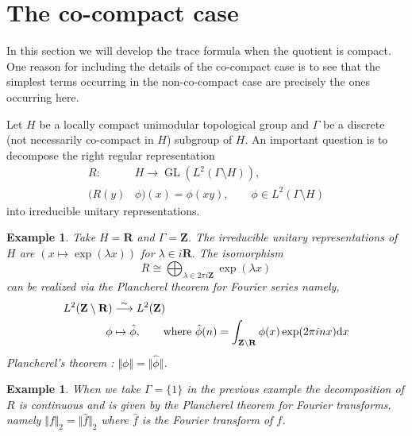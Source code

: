 \documentclass[11pt]{amsart}
\def\R{\mathbf R}
\def\Z{\mathbf Z}
\def\d{\text d}
\def\bs{\setminus}
\def\gl{\operatorname{GL}}
\def\Ltwo{L^2}
\def\norm#1{\Vert #1 \Vert} %
\newtheorem{example}[theorem]{Example}
\theoremstyle{remark}
\begin{document}
\section{The co-compact case} \label{sec_cpt}

In this section we will develop the trace formula when the quotient is compact. One reason for including the details of the co-compact case is to see that the simplest terms occurring in the non-co-compact case are precisely the ones occurring here. 

Let $H$ be a locally compact unimodular topological group and $\Gamma$ be a discrete (not necessarily co-compact in $H$) subgroup of $H$. An important question is to decompose the right regular representation 
\begin{align*}
	R : & H \to \gl(\Ltwo(\Gamma \bs H)), \\
	(R(y) & \phi)(x) = \phi(xy), \qquad \phi \in \Ltwo(\Gamma\bs H)
\end{align*}
into irreducible unitary representations. 
\begin{example}
	Take $H = \R$ and $\Gamma = \Z$. The irreducible unitary representations of $H$ are $(x \mapsto \exp(\lambda x)) $ for $\lambda \in i\R.$ The isomorphism 
	\[ R \cong \displaystyle\bigoplus_{\lambda \in 2\pi i \Z} \exp(\lambda x) \]
	can be realized via the Plancherel theorem for Fourier series namely,
	\begin{align*}
		\Ltwo(\Z \bs \R) & \overset{\sim}{\longrightarrow} \Ltwo(\Z) \\
		\phi & \mapsto \hat\phi, \qquad \text{where }\hat\phi(n) = \int_{\Z\bs \R} \phi(x) \exp(2\pi i n x) \d x
	\end{align*}
	Plancherel's theorem : $\norm{\phi} = \norm{\hat\phi}$. 
\end{example}

\begin{example}
	When we take $\Gamma = \{1\}$ in the previous example the decomposition of $R$ is continuous and is given by the Plancherel theorem for Fourier transforms, namely $\norm{f}_2 = \norm{\hat f}_2$ where $\hat f$ is the Fourier transform of $f$. 
\end{example}
\end{document}
